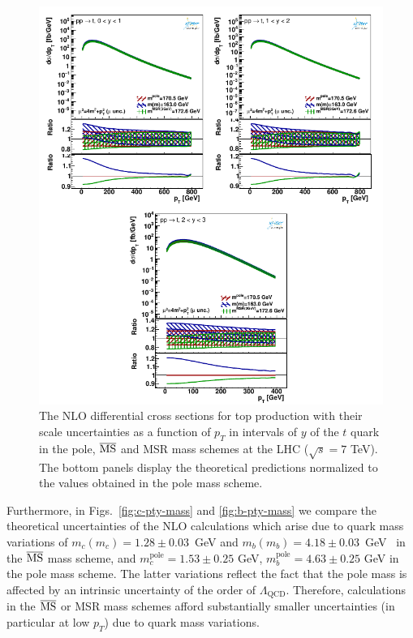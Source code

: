 \documentclass[12pt,a4paper]{article}
\newcommand{\msbar}{\ensuremath{\overline{\rm MS}}\xspace}
\newcommand{\polem}[1][]{\ensuremath{m_{#1}^{\text{pole}}}\xspace}
\begin{document}
\begin{figure}
    \centering
    \includegraphics[width=1.00\textwidth]{figs/parton-t/dyn-therr3-all.pdf}
    \caption{The NLO differential cross sections for top production with their scale uncertainties as a function of $p_T$ in intervals of $y$ of the $t$ quark in the pole, \msbar and MSR mass schemes at the LHC ($\sqrt{s} = 7$ TeV). The bottom panels display the theoretical predictions normalized to the values obtained in the pole mass scheme.}
    \label{fig:t-pty-mu}
\end{figure}

Furthermore, in Figs.~\ref{fig:c-pty-mass} and \ref{fig:b-pty-mass} we compare the theoretical uncertainties of the NLO calculations which arise due to quark mass variations of $m_c(m_c) = 1.28 \pm 0.03$~GeV and $m_b(m_b) = 4.18 \pm 0.03$~GeV~\cite{Tanabashi:2018oca} in the \msbar mass scheme, and $\polem[c] = 1.53 \pm 0.25$ GeV, $\polem[b] = 4.63 \pm 0.25$ GeV in the pole mass scheme. The latter variations reflect the fact that the pole mass is affected by an intrinsic uncertainty of the order of $\Lambda_{\text{QCD}}$. Therefore, calculations in the \msbar or MSR mass schemes afford substantially smaller uncertainties (in particular at low $p_T$) due to quark mass variations.
\end{document}
